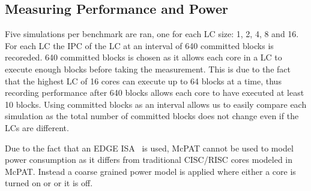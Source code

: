 \subsection{Measuring Performance and Power}

Five simulations per benchmark are ran, one for each LC size: 1, 2, 4, 8 and 16.
For each LC the IPC of the LC at an interval of 640 committed blocks is recoreded.
640 committed blocks is chosen as it allows each core in a LC to execute enough blocks before taking the measurement.
This is due to the fact that the highest LC of 16 cores can execute up to 64 blocks at a time, thus recording performance after 640 blocks allows each core to have executed at least 10 blocks.
Using committed blocks as an interval allows us to easily compare each simulation as the total number of committed blocks does not change even if the LCs are different.

Due to the fact that an EDGE ISA~\cite{smith2006edge} is used, McPAT cannot be used to model power consumption as it differs from traditional CISC/RISC cores modeled in McPAT.
Instead a coarse grained power model is applied where either a core is turned on or or it is off. 
